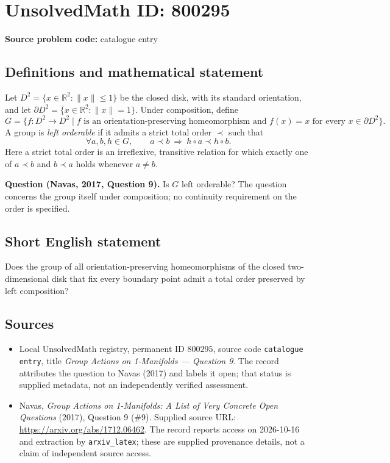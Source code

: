 \documentclass[11pt]{article}
\newcommand{\R}{\mathbb{R}}
\begin{document}
\section*{UnsolvedMath ID: 800295}
\textbf{Source problem code:} catalogue entry
\subsection{Definitions and mathematical statement}
Let \(D^2=\{x\in\R^2:\|x\|\leq 1\}\) be the closed disk, with its standard orientation, and let \(\partial D^2=\{x\in\R^2:\|x\|=1\}\). Under composition, define
\[
G=\{f:D^2\to D^2\mid f\text{ is an orientation-preserving homeomorphism and }f(x)=x\text{ for every }x\in\partial D^2\}.
\]
A group is \emph{left orderable} if it admits a strict total order \(\prec\) such that
\[
\forall a,b,h\in G,\qquad a\prec b\ \Longrightarrow\ h\circ a\prec h\circ b.
\]
Here a strict total order is an irreflexive, transitive relation for which exactly one of \(a\prec b\) and \(b\prec a\) holds whenever \(a\ne b\).

\textbf{Question (Navas, 2017, Question 9).} Is \(G\) left orderable? The question concerns the group itself under composition; no continuity requirement on the order is specified.
\subsection{Short English statement}
Does the group of all orientation-preserving homeomorphisms of the closed two-dimensional disk that fix every boundary point admit a total order preserved by left composition?
\subsection{Sources}
\begin{itemize}
\item Local UnsolvedMath registry, permanent ID \(800295\), source code \texttt{catalogue entry}, title \emph{Group Actions on 1-Manifolds --- Question 9}. The record attributes the question to Navas (2017) and labels it open; that status is supplied metadata, not an independently verified assessment.
\item Navas, \emph{Group Actions on 1-Manifolds: A List of Very Concrete Open Questions} (2017), Question 9 (\#9). Supplied source URL: \url{https://arxiv.org/abs/1712.06462}. The record reports access on 2026-10-16 and extraction by \texttt{arxiv\_latex}; these are supplied provenance details, not a claim of independent source access.
\end{itemize}
\end{document}

